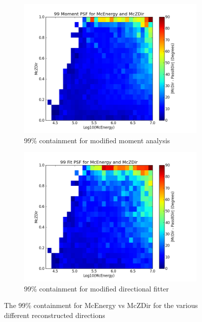 \documentclass[11pt]{article}
\begin{document}
\begin{figure}[h]
\begin{subfigure}[b]{0.5\textwidth}
                \label{con99_pass8}
        \end{subfigure}
                \begin{subfigure}[b]{0.5\textwidth}
                \centering
                \includegraphics[width=\textwidth]{psf99_2D_moment}
                \caption{99\% containment for modified moment analysis}
                \label{con99_moment}
        \end{subfigure}%
        \begin{subfigure}[b]{0.5\textwidth}
                \centering
                \includegraphics[width=\textwidth]{psf99_2D_fit}
                \caption{99\% containment for modified directional fitter}
                \label{con99_fit}
        \end{subfigure}
        \caption{The 99\% containment for McEnergy vs McZDir for the various different reconstructed directions }
        \label{con99}
\end{figure}
\end{document}

